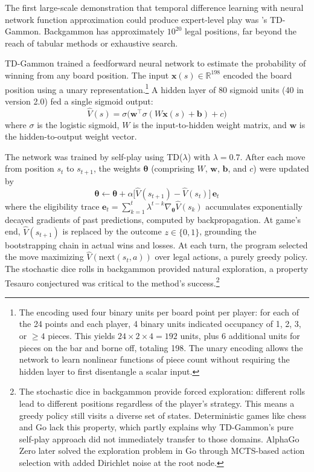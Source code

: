 The first large-scale demonstration that temporal difference learning with neural network function approximation could produce expert-level play was \citet{tesauro1994}'s TD-Gammon. Backgammon has approximately $10^{20}$ legal positions, far beyond the reach of tabular methods or exhaustive search.

TD-Gammon trained a feedforward neural network to estimate the probability of winning from any board position. The input $\mathbf{x}(s) \in \mathbb{R}^{198}$ encoded the board position using a unary representation.\footnote{The encoding used four binary units per board point per player: for each of the 24 points and each player, 4 binary units indicated occupancy of 1, 2, 3, or $\geq 4$ pieces. This yields $24 \times 2 \times 4 = 192$ units, plus 6 additional units for pieces on the bar and borne off, totaling 198. The unary encoding allows the network to learn nonlinear functions of piece count without requiring the hidden layer to first disentangle a scalar input.} A hidden layer of 80 sigmoid units (40 in version 2.0) fed a single sigmoid output:
\begin{equation}
\hat{V}(s) = \sigma\!\bigl(\mathbf{w}^\top \sigma(W\mathbf{x}(s) + \mathbf{b}) + c\bigr)
\end{equation}
where $\sigma$ is the logistic sigmoid, $W$ is the input-to-hidden weight matrix, and $\mathbf{w}$ is the hidden-to-output weight vector.

The network was trained by self-play using TD($\lambda$) with $\lambda = 0.7$. After each move from position $s_t$ to $s_{t+1}$, the weights $\boldsymbol{\theta}$ (comprising $W$, $\mathbf{w}$, $\mathbf{b}$, and $c$) were updated by
\begin{equation}
\boldsymbol{\theta} \leftarrow \boldsymbol{\theta} + \alpha \bigl[\hat{V}(s_{t+1}) - \hat{V}(s_t)\bigr] \, \mathbf{e}_t
\end{equation}
where the eligibility trace $\mathbf{e}_t = \sum_{k=1}^{t} \lambda^{t-k} \nabla_{\boldsymbol{\theta}} \hat{V}(s_k)$ accumulates exponentially decayed gradients of past predictions, computed by backpropagation. At game's end, $\hat{V}(s_{t+1})$ is replaced by the outcome $z \in \{0, 1\}$, grounding the bootstrapping chain in actual wins and losses. At each turn, the program selected the move maximizing $\hat{V}(\mathrm{next}(s_t, a))$ over legal actions, a purely greedy policy. The stochastic dice rolls in backgammon provided natural exploration, a property Tesauro conjectured was critical to the method's success.\footnote{The stochastic dice in backgammon provide forced exploration: different rolls lead to different positions regardless of the player's strategy. This means a greedy policy still visits a diverse set of states. Deterministic games like chess and Go lack this property, which partly explains why TD-Gammon's pure self-play approach did not immediately transfer to those domains. AlphaGo Zero later solved the exploration problem in Go through MCTS-based action selection with added Dirichlet noise at the root node.}

